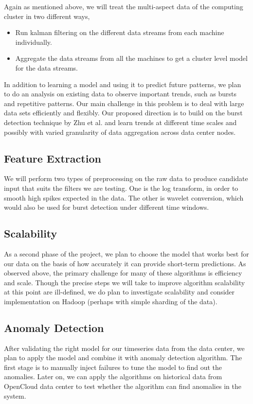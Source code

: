 Again as mentioned above, we will treat the multi-aspect data of the computing cluster in two different ways,

\begin{itemize}
\item Run kalman filtering on the different data streams from each machine individually.
\item Aggregate the data streams from all the machines to get a cluster level model for the data streams.
\end{itemize}

In addition to learning a model and using it to predict future patterns, we plan to do an analysis on existing data to observe important trends, such as bursts and repetitive patterns. Our main challenge in this problem is to deal with large data sets efficiently and flexibly. Our proposed direction is to build on the burst detection technique by Zhu et al. \cite{Zhu2003} and learn trends at different time scales and possibly with varied granularity of data aggregation across data center nodes.

\subsection{Feature Extraction}
\label{sec:method:features}
We will perform two types of preprocessing on the raw data to produce candidate input that suits the filters we are testing. One is the log transform, in order to smooth high spikes expected in the data. The other is wavelet conversion, which would also be used for burst detection under different time windows.

\subsection{Scalability}
\label{sec:method:scale}
As a second phase of the project, we plan to choose the model that works best for our data on the basis of how accurately it can provide short-term predictions. As observed above, the primary challenge for many of these algorithms is efficiency and scale. Though the precise steps we will take to improve algorithm scalability at this point are ill-defined, we do plan to investigate scalability and consider implementation on Hadoop (perhaps with simple sharding of the data).

\subsection{Anomaly Detection}
\label{sec:method:anomaly}
After validating the right model for our timeseries data from the data center, we plan to apply the model and combine it with anomaly detection algorithm. The first stage is to manually inject failures to tune the model to find out the anomalies. Later on, we can apply the algorithms on historical data from OpenCloud data center to test whether the algorithm can find anomalies in the system.

